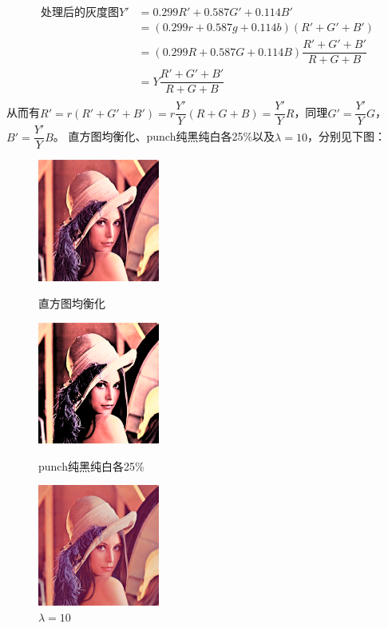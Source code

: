 \documentclass[a4paper,UTF8]{article}
\numberwithin{equation}{section}
\begin{document}
\begin{enumerate}[(\romannumeral1)]
	\begin{align*}
		处理后的灰度图Y'&=0.299R'+0.587G'+0.114B'\\
		&=(0.299r+0.587g+0.114b)(R'+G'+B')\\
		&=(0.299R+0.587G+0.114B)\dfrac{R'+G'+B'}{R+G+B}\\
		&=Y\dfrac{R'+G'+B'}{R+G+B}\\
	\end{align*}
	\qquad 从而有$R'=r(R'+G'+B')=r\dfrac{Y'}{Y}(R+G+B)=\dfrac{Y'}{Y}R$，同理$G'=\dfrac{Y'}{Y}G$，$B'=\dfrac{Y'}{Y}B$。	直方图均衡化、punch纯黑纯白各25\%以及$\lambda=10$，分别见下图：
\begin{figure}[htbp]
\centering
\begin{minipage}[t]{0.30\textwidth}
\centering
\includegraphics[width=4cm]{Lenna_color_hist.png}
\caption{直方图均衡化}
\label{Lenna:color_hist}
\end{minipage}
\centering
\begin{minipage}[t]{0.30\textwidth}
\centering
\includegraphics[width=4cm]{Lenna_color_punch_25.png}
\caption{punch纯黑纯白各25\%}
\label{Lenna:color_punch}
\end{minipage}
\centering
\begin{minipage}[t]{0.30\textwidth}
\centering
\includegraphics[width=4cm]{Lenna_color_limit_10.png}
\caption{$\lambda=10$}
\label{Lenna:color_lambda}
\end{minipage}
\end{figure}
\end{enumerate}
\end{document}
